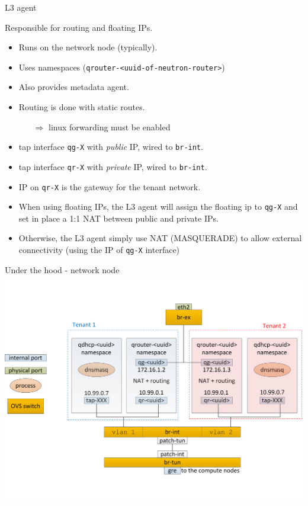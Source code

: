 \documentclass[english,serif,mathserif,xcolor=pdftex,dvipsnames,table]{beamer}
\begin{document}
\begin{frame}
  {L3 agent}

  Responsible for routing and floating IPs.

\scriptsize  \begin{itemize}
  \item Runs on the network node (typically).

  \item Uses namespaces (\texttt{qrouter-<uuid-of-neutron-router>})

  \item Also provides metadata agent.

  \item Routing is done with static routes.
    \begin{itemize}\scriptsize
    \item[$\Rightarrow$] linux forwarding must be enabled
    \end{itemize}
  \item tap interface \texttt{qg-X} with \textit{public} IP, wired to
    \texttt{br-int}.

  \item tap interface \texttt{qr-X} with \textit{private} IP, wired to
    \texttt{br-int}.

  \item IP on \texttt{qr-X} is the gateway for the tenant network.

  \item When using floating IPs, the L3 agent will assign the floating
    ip to \texttt{qg-X} and set in place a 1:1 NAT between public and
    private IPs.

  \item Otherwise, the L3 agent simply use NAT (MASQUERADE) to allow
    external connectivity (using the IP of \texttt{qg-X} interface)
  \end{itemize}
\end{frame}

\begin{frame}{Under the hood - network node}
  \includegraphics[width=\linewidth]{under-the-hood-neutron-server}
\end{frame}
\end{document}

